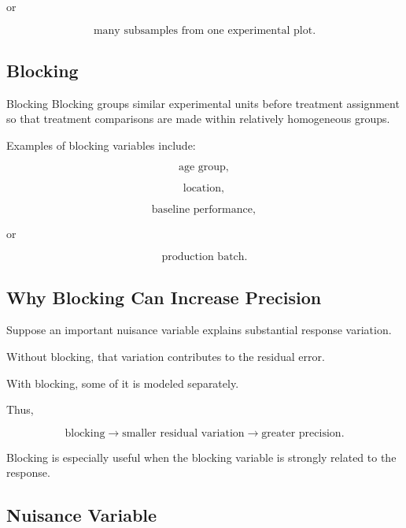 or

\[
\boxed{
\text{many subsamples from one experimental plot}.
}
\]

\subsection{Blocking}
\label{subsec:blocking-design}

\begin{definitionbox}{Blocking}
Blocking groups similar experimental units before treatment assignment
so that treatment comparisons are made within relatively homogeneous
groups.
\end{definitionbox}

Examples of blocking variables include:

\[
\boxed{
\text{age group},
}
\]

\[
\boxed{
\text{location},
}
\]

\[
\boxed{
\text{baseline performance},
}
\]

or

\[
\boxed{
\text{production batch}.
}
\]

\subsection{Why Blocking Can Increase Precision}
\label{subsec:blocking-precision}

Suppose an important nuisance variable explains substantial response
variation.

Without blocking, that variation contributes to the residual error.

With blocking, some of it is modeled separately.

Thus,

\[
\boxed{
\text{blocking}
\rightarrow
\text{smaller residual variation}
\rightarrow
\text{greater precision}.
}
\]

Blocking is especially useful when the blocking variable is strongly
related to the response.

\subsection{Nuisance Variable}
\label{subsec:nuisance-variable}

